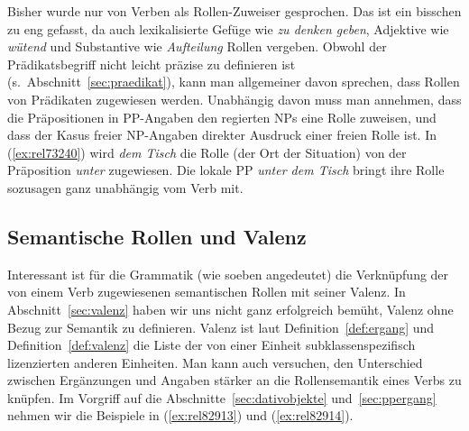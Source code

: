 
Bisher wurde nur von Verben als Rollen-Zuweiser gesprochen.
Das ist ein bisschen zu eng gefasst, da auch lexikalisierte Gefüge wie \textit{zu denken geben}, Adjektive wie \textit{wütend} und Substantive wie \textit{Aufteilung} Rollen vergeben.
Obwohl der Prädikatsbegriff nicht leicht präzise zu definieren ist (s.\ Abschnitt~\ref{sec:praedikat}), kann man allgemeiner davon sprechen, dass Rollen von Prädikaten zugewiesen werden.
Unabhängig davon muss man annehmen, dass die Präpositionen in PP-Angaben den regierten NPs eine Rolle zuweisen, und dass der Kasus freier NP-Angaben direkter Ausdruck einer freien Rolle ist.
In (\ref{ex:rel73240}) wird \textit{dem Tisch} die Rolle (der Ort der Situation) von der Präposition \textit{unter} zugewiesen.
Die lokale PP \textit{unter dem Tisch} bringt ihre Rolle sozusagen ganz unabhängig vom Verb mit.

\begin{exe}
\end{exe}

\subsection{Semantische Rollen und Valenz}


Interessant ist für die Grammatik (wie soeben angedeutet) die Verknüpfung der von einem Verb zugewiesenen semantischen Rollen mit seiner Valenz.
In Abschnitt~\ref{sec:valenz} haben wir uns nicht ganz erfolgreich bemüht, Valenz ohne Bezug zur Semantik zu definieren.
Valenz ist laut Definition~\ref{def:ergang} und Definition~\ref{def:valenz} die Liste der von einer Einheit subklassenspezifisch lizenzierten anderen Einheiten.
Man kann auch versuchen, den Unterschied zwischen Ergänzungen und Angaben stärker an die Rollensemantik eines Verbs zu knüpfen.
Im Vorgriff auf die Abschnitte~\ref{sec:dativobjekte} und~\ref{sec:ppergang} nehmen wir die Beispiele in (\ref{ex:rel82913}) und (\ref{ex:rel82914}).

\begin{exe}
  \ex\label{ex:rel82913} 
  \begin{xlist}
  \end{xlist}
  \ex\label{ex:rel82914} 
  \begin{xlist}
  \end{xlist}
\end{exe}

